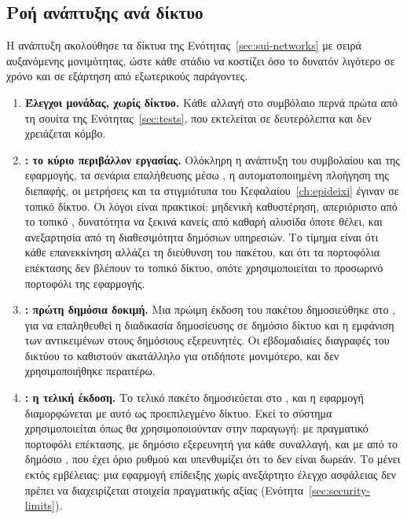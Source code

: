 \subsection{Ροή ανάπτυξης ανά δίκτυο}
\label{sec:dev-flow}

Η ανάπτυξη ακολούθησε τα δίκτυα της Ενότητας~\ref{sec:sui-networks} με σειρά αυξανόμενης
μονιμότητας, ώστε κάθε στάδιο να κοστίζει όσο το δυνατόν λιγότερο σε χρόνο και σε
εξάρτηση από εξωτερικούς παράγοντες.

\begin{enumerate}[nosep]
  \item \textbf{Έλεγχοι μονάδας, χωρίς δίκτυο.} Κάθε αλλαγή στο συμβόλαιο περνά πρώτα από
        τη σουίτα της Ενότητας~\ref{sec:tests}, που εκτελείται σε δευτερόλεπτα και δεν
        χρειάζεται κόμβο.
  \item \textbf{: το κύριο περιβάλλον εργασίας.} Ολόκληρη η ανάπτυξη του
        συμβολαίου και της εφαρμογής, τα σενάρια επαλήθευσης μέσω , η
        αυτοματοποιημένη πλοήγηση της διεπαφής, οι μετρήσεις  και τα στιγμιότυπα
        του Κεφαλαίου~\ref{ch:epideixi} έγιναν σε τοπικό δίκτυο. Οι λόγοι είναι
        πρακτικοί: μηδενική καθυστέρηση, απεριόριστο  από το τοπικό ,
        δυνατότητα να ξεκινά κανείς από καθαρή αλυσίδα όποτε θέλει, και ανεξαρτησία από
        τη διαθεσιμότητα δημόσιων υπηρεσιών. Το τίμημα είναι ότι κάθε επανεκκίνηση αλλάζει
        τη διεύθυνση του πακέτου, και ότι τα πορτοφόλια επέκτασης δεν βλέπουν το τοπικό
        δίκτυο, οπότε χρησιμοποιείται το προσωρινό πορτοφόλι της εφαρμογής.
  \item \textbf{: πρώτη δημόσια δοκιμή.} Μια πρώιμη έκδοση του πακέτου
        δημοσιεύθηκε στο , για να επαληθευθεί η διαδικασία δημοσίευσης σε
        δημόσιο δίκτυο και η εμφάνιση των αντικειμένων στους δημόσιους εξερευνητές. Οι
        εβδομαδιαίες διαγραφές του δικτύου το καθιστούν ακατάλληλο για οτιδήποτε
        μονιμότερο, και δεν χρησιμοποιήθηκε περαιτέρω.
  \item \textbf{: η τελική έκδοση.} Το τελικό πακέτο δημοσιεύεται στο
        , και η εφαρμογή διαμορφώνεται με αυτό ως προεπιλεγμένο δίκτυο. Εκεί
        το σύστημα χρησιμοποιείται όπως θα χρησιμοποιούνταν στην παραγωγή: με πραγματικό
        πορτοφόλι επέκτασης, με δημόσιο εξερευνητή για κάθε συναλλαγή, και με 
        από το δημόσιο , που έχει όριο ρυθμού και υπενθυμίζει ότι το 
        δεν είναι δωρεάν. Το  μένει εκτός εμβέλειας: μια εφαρμογή επίδειξης
        χωρίς ανεξάρτητο έλεγχο ασφάλειας δεν πρέπει να διαχειρίζεται στοιχεία
        πραγματικής αξίας (Ενότητα~\ref{sec:security-limits}).
\end{enumerate}

